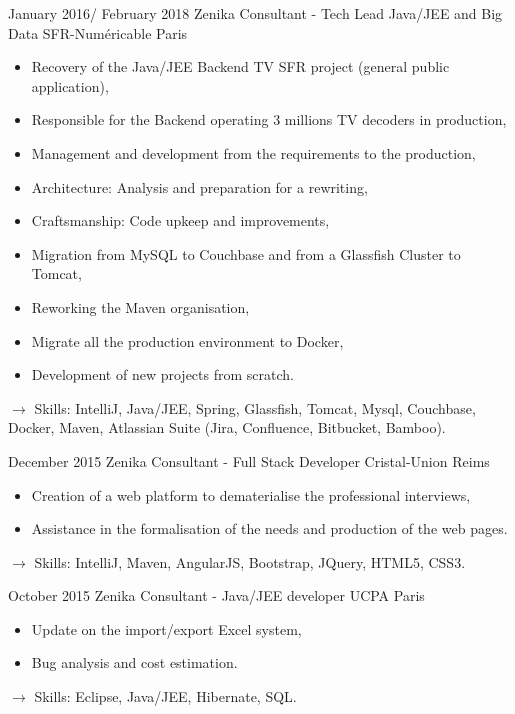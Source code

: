 \documentclass[11pt,a4paper,sans]{moderncv}
\begin{document}
\cventry
{January 2016/ February 2018}
{Zenika Consultant - Tech Lead Java/JEE and Big Data}
{SFR-Numéricable}
{Paris}
{}
{\begin{itemize}
    \item Recovery of the Java/JEE Backend TV SFR project (general public application),
    \item Responsible for the Backend operating 3 millions TV decoders in production,
    \item Management and development from the requirements to the production,
    \item Architecture: Analysis and preparation for a rewriting,
    \item Craftsmanship: Code upkeep and improvements,
    \item Migration from MySQL to Couchbase and from a Glassfish Cluster to Tomcat,
    \item Reworking the Maven organisation,
    \item Migrate all the production environment to Docker,
    \item Development of new projects from scratch.
\end{itemize}
$\rightarrow$ Skills: IntelliJ, Java/JEE, Spring, Glassfish, Tomcat, Mysql, Couchbase, Docker, Maven, Atlassian Suite (Jira, Confluence, Bitbucket, Bamboo).
}   %

\cventry
{December 2015}
{Zenika Consultant - Full Stack Developer}
{Cristal-Union}
{Reims}
{}
{\begin{itemize}
    \item Creation of a web platform to dematerialise the professional interviews,
    \item Assistance in the formalisation of the needs and production of the web pages.
\end{itemize}
$\rightarrow$ Skills: IntelliJ, Maven, AngularJS, Bootstrap, JQuery, HTML5, CSS3.
}   %

\cventry
{October 2015}
{Zenika Consultant - Java/JEE developer}
{UCPA}
{Paris}
{}
{\begin{itemize}
    \item Update on the import/export Excel system,
    \item Bug analysis and cost estimation.
\end{itemize}
$\rightarrow$ Skills: Eclipse, Java/JEE, Hibernate, SQL.
}   %
\end{document}
